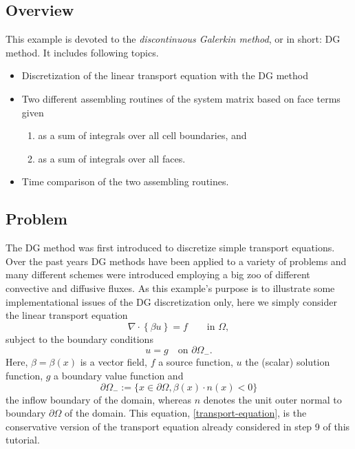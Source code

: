 \documentclass[11pt]{article}
\begin{document}
\subsection{Overview}
This example is devoted to the \emph{discontinuous Galerkin method}, or
in short: DG method. It includes following topics.
\begin{itemize}
\item Discretization of the linear transport equation with the DG method
\item Two different assembling routines of the system matrix based on face terms given
\begin{enumerate}
\item as a sum of integrals over all cell boundaries, and
\item as a sum of integrals over all faces.
\end{enumerate}
\item Time comparison of the two assembling routines.
\end{itemize}

\subsection{Problem}
The DG method was first introduced to discretize simple transport
equations. Over the past years DG methods have been applied to a
variety of problems and many different schemes were introduced
employing a big zoo of different convective and diffusive fluxes.  As
this example's purpose is to illustrate some implementational issues
of the DG discretization only, here we simply consider the linear
transport equation
\begin{equation}\label{transport-equation}
  \nabla\cdot \left\{\beta u\right\}=f  \qquad\mbox{in }\Omega,
\end{equation}
subject to the boundary conditions
\[
u=g\quad\mbox{on }\partial\Omega_-.
\]
Here, $\beta=\beta(x)$ is a vector field, $f$ a source function, $u$ the
(scalar) solution function, $g$ a boundary value function and
\[
\partial\Omega_-:=\{x\in\partial\Omega, \beta(x)\cdot n(x)<0\}
\]
the inflow boundary of the domain, whereas $n$ denotes the unit outer
normal to boundary $\partial\Omega$ of the domain. This equation,
\eqref{transport-equation}, is the conservative version of the
transport equation already considered in step 9 of this tutorial.
\end{document}
